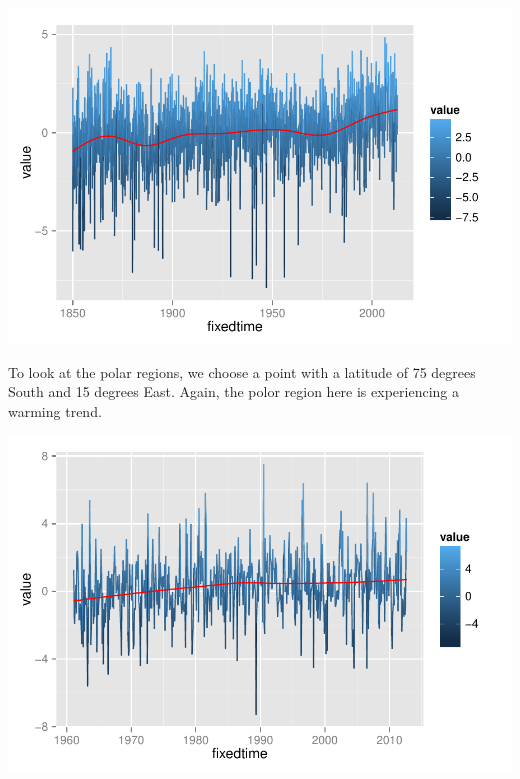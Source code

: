 \documentclass{article}\usepackage{graphicx, color}
\newenvironment{knitrout}{}{} %
\begin{document}
\begin{knitrout}
\color{fgcolor}\includegraphics[width=\linewidth]{figure/augsburg-trend} 
\end{knitrout}




To look at the polar regions, we choose a point with a latitude of 75 degrees South and 15 degrees East. Again, the polor region here is experiencing a warming trend.


\begin{knitrout}
\color{fgcolor}\includegraphics[width=\linewidth]{figure/antartic-trend} 
\end{knitrout}
\end{document}
